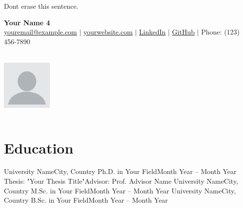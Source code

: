 \label{ResumeFour} %
\thesisspacing %


{\color{white}Dont erase this sentence.}
\medskip



\begin{minipage}{0.7\textwidth}
    \textbf{\Huge Your Name 4} \\[5pt]
    \small \href{mailto:youremail@example.com}{youremail@example.com} $|$ 
    \href{https://yourwebsite.com}{yourwebsite.com} $|$ 
    \href{https://linkedin.com/in/yourprofile}{LinkedIn} $|$ 
    \href{https://github.com/yourprofile}{GitHub} $|$ 
    Phone: (123) 456-7890
\end{minipage}
\begin{minipage}{0.3\textwidth}
    \begin{flushright}
        \includegraphics[width=2.5cm, height=3.5cm]{imgs/your_photo.png} %
    \end{flushright}
\end{minipage}

\section*{Education}
\begin{itemize}[leftmargin=*]
    \resumeEntry
        {University Name}{City, Country}
        {Ph.D. in Your Field}{Month Year – Month Year}
    \resumeSubentry
        {Thesis: "Your Thesis Title"}{Advisor: Prof. Advisor Name}
    \resumeEntry
        {University Name}{City, Country}
        {M.Sc. in Your Field}{Month Year – Month Year}
    \resumeEntry
        {University Name}{City, Country}
        {B.Sc. in Your Field}{Month Year – Month Year}
\end{itemize}

